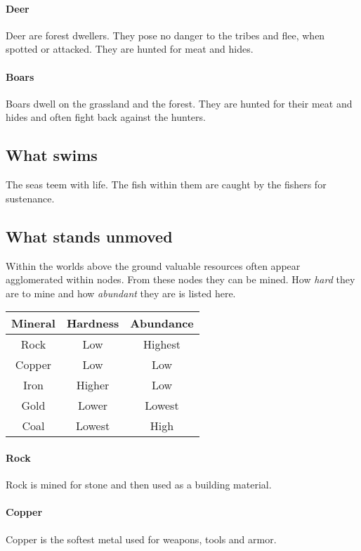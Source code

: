 \documentclass[a4paper]{book}
\begin{document}
\paragraph{Deer}
Deer are forest dwellers. They pose no danger to the tribes and flee, when
spotted or attacked. They are hunted for meat and hides.

\paragraph{Boars}
Boars dwell on the grassland and the forest. They are hunted for their meat and
hides and often fight back against the hunters.

\subsection{What swims}
The seas teem with life. The fish within them are caught by the fishers for
sustenance.

\subsection{What stands unmoved}
Within the worlds above the ground valuable resources often appear agglomerated
within nodes. From these nodes they can be mined. How \emph{hard} they are to
mine and how \emph{abundant} they are is listed here.

\begin{longtable}{ccc}
	\toprule
	Mineral & Hardness & Abundance \\
	\midrule
	Rock    & Low      & Highest   \\
	Copper  & Low      & Low       \\
	Iron    & Higher   & Low       \\
	Gold    & Lower    & Lowest    \\
	Coal    & Lowest   & High      \\
	\bottomrule
\end{longtable}

\paragraph{Rock}
Rock is mined for stone and then used as a building material.

\paragraph{Copper}
Copper is the softest metal used for weapons, tools and armor.
\end{document}
